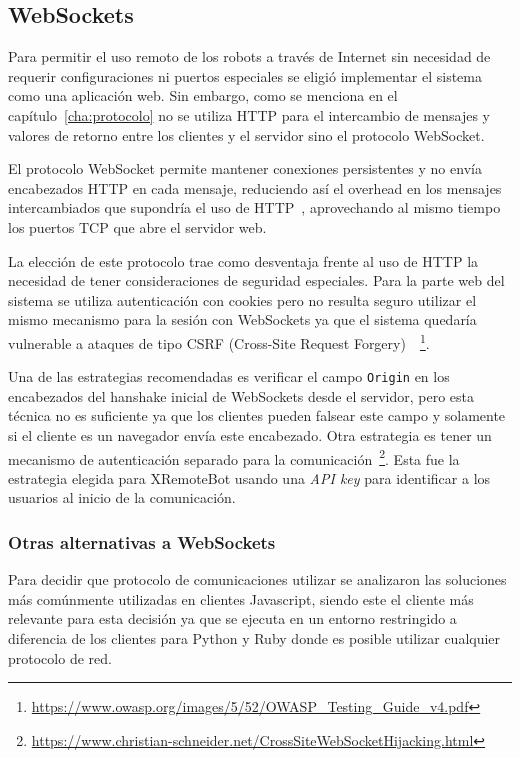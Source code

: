 \subsection{WebSockets}\label{sec:websockets}

Para permitir el uso remoto de los robots a través de Internet sin necesidad
de requerir configuraciones ni puertos especiales se eligió implementar el
sistema como una
aplicación web. Sin embargo, como se menciona en el
capítulo~\ref{cha:protocolo} no se utiliza HTTP para el intercambio de
mensajes y valores de retorno entre los clientes y el servidor sino el
protocolo WebSocket.

El protocolo WebSocket permite mantener conexiones persistentes y no envía
encabezados HTTP en cada mensaje, reduciendo así el overhead en los mensajes
intercambiados que supondría el uso de HTTP~\citep{wang_2013}, aprovechando al
mismo tiempo los puertos TCP que abre el servidor web.

La elección de este protocolo trae como desventaja frente al uso de HTTP la
necesidad de tener consideraciones de seguridad especiales. Para la parte
web del sistema se utiliza autenticación con cookies pero no resulta seguro
utilizar el mismo mecanismo para la sesión con WebSockets ya que el sistema
quedaría vulnerable a ataques de tipo CSRF (Cross-Site Request
Forgery)~\citep{owasp_2014}~\footnote{
\url{https://www.owasp.org/images/5/52/OWASP_Testing_Guide_v4.pdf}}.

Una de las estrategias recomendadas es verificar el campo \texttt{Origin}
en los encabezados del hanshake inicial de WebSockets
desde el servidor, pero esta técnica no es suficiente ya que los
clientes pueden falsear este campo y solamente si el cliente es un navegador
envía este encabezado.
Otra estrategia es tener un mecanismo de autenticación
separado para la comunicación~\footnote{\url{https://www.christian-schneider.net/CrossSiteWebSocketHijacking.html}}.
Esta fue la estrategia elegida para XRemoteBot usando una \textit{API key}
para identificar a los usuarios al inicio de la comunicación.

\subsubsection{Otras alternativas a WebSockets}
Para decidir que protocolo de comunicaciones utilizar se analizaron
las soluciones más comúnmente utilizadas en clientes Javascript, siendo
este el cliente más relevante para esta decisión ya que se ejecuta en
un entorno restringido a diferencia de los clientes para Python y Ruby donde
es posible utilizar cualquier protocolo de red.

